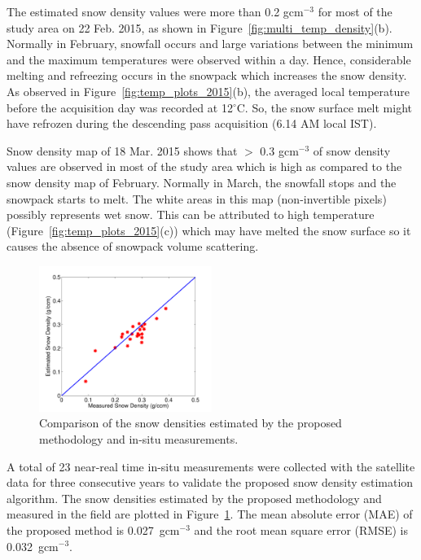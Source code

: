 The estimated snow density values were more than 0.2 gcm$^{-3}$ for most of the study area on 22 Feb. 2015, as shown in Figure~\ref{fig:multi_temp_density}(b). Normally in February, snowfall occurs and large variations between the minimum and the maximum temperatures were observed within a day. Hence, considerable melting and refreezing occurs in the snowpack which increases the snow density. As observed in Figure~\ref{fig:temp_plots_2015}(b), the averaged local temperature before the acquisition day was recorded at 12$^\circ$C. So, the snow surface melt might have refrozen during the descending pass acquisition (6.14 AM local IST). 

Snow density map of 18 Mar. 2015 shows that $>$ 0.3 gcm$^{-3}$ of snow density values are observed in most of the study area which is high as compared to the snow density map of February. Normally in March, the snowfall stops and the snowpack starts to melt. The white areas in this map (non-invertible pixels) possibly represents wet snow. This can be attributed to high temperature (Figure~\ref{fig:temp_plots_2015}(c)) which may have melted the snow surface so it causes the absence of snowpack volume scattering.

\begin{figure}[!htbp]
	\centering
	\includegraphics[width=0.5\textwidth]{Figures_sd/snow_density_validation}
	\caption [validation plot of snow density algorithm]{Comparison of the snow densities estimated by the proposed methodology and in-situ measurements.}
	\label{fig:validation_plot}
\end{figure} 

A total of 23 near-real time in-situ measurements were collected with the satellite data for three consecutive years to validate the proposed snow density estimation algorithm. The snow densities estimated by the proposed methodology and measured in the field are plotted in Figure~\ref{fig:validation_plot}. The mean absolute error (MAE) of  the proposed method is 0.027~gcm$^{-3}$ and the root mean square error (RMSE) is 0.032~gcm$^{-3}$. 



